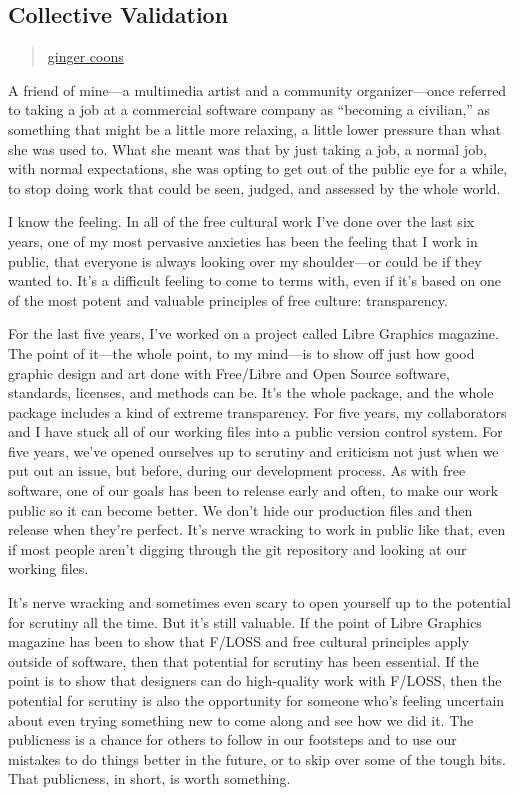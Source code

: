 \subsection{Collective Validation}\label{collective-validation}

\begin{quote}
\hyperlink{ginger-coons}{ginger coons}
\end{quote}

A friend of mine---a multimedia artist and a community organizer---once
referred to taking a job at a commercial software company as ``becoming
a civilian,'' as something that might be a little more relaxing, a
little lower pressure than what she was used to. What she meant was that
by just taking a job, a normal job, with normal expectations, she was
opting to get out of the public eye for a while, to stop doing work that
could be seen, judged, and assessed by the whole world.

I know the feeling. In all of the free cultural work I've done over the
last six years, one of my most pervasive anxieties has been the feeling
that I work in public, that everyone is always looking over my
shoulder---or could be if they wanted to. It's a difficult feeling to
come to terms with, even if it's based on one of the most potent and
valuable principles of free culture: transparency.

For the last five years, I've worked on a project called Libre Graphics
magazine. The point of it---the whole point, to my mind---is to show off
just how good graphic design and art done with Free/Libre and Open
Source software, standards, licenses, and methods can be. It's the whole
package, and the whole package includes a kind of extreme transparency.
For five years, my collaborators and I have stuck all of our working
files into a public version control system. For five years, we've opened
ourselves up to scrutiny and criticism not just when we put out an
issue, but before, during our development process. As with free
software, one of our goals has been to release early and often, to make
our work public so it can become better. We don't hide our production
files and then release when they're perfect. It's nerve wracking to work
in public like that, even if most people aren't digging through the git
repository and looking at our working files.

It's nerve wracking and sometimes even scary to open yourself up to the
potential for scrutiny all the time. But it's still valuable. If the
point of Libre Graphics magazine has been to show that F/LOSS and free
cultural principles apply outside of software, then that potential for
scrutiny has been essential. If the point is to show that designers can
do high-quality work with F/LOSS, then the potential for scrutiny is
also the opportunity for someone who's feeling uncertain about even
trying something new to come along and see how we did it. The publicness
is a chance for others to follow in our footsteps and to use our
mistakes to do things better in the future, or to skip over some of the
tough bits. That publicness, in short, is worth something.

